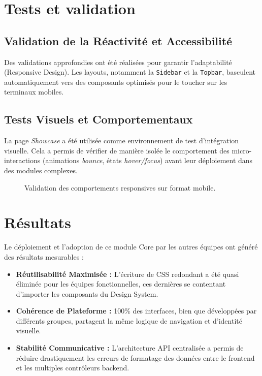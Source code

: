\documentclass[12pt,a4paper]{report}
\begin{document}
\section{Tests et validation}

\subsection{Validation de la Réactivité et Accessibilité}
Des validations approfondies ont été réalisées pour garantir l'adaptabilité (Responsive Design). Les layouts, notamment la \texttt{Sidebar} et la \texttt{Topbar}, basculent automatiquement vers des composants optimisés pour le toucher sur les terminaux mobiles.

\subsection{Tests Visuels et Comportementaux}
La page \textit{Showcase} a été utilisée comme environnement de test d'intégration visuelle. Cela a permis de vérifier de manière isolée le comportement des micro-interactions (animations \textit{bounce}, états \textit{hover/focus}) avant leur déploiement dans des modules complexes.

\begin{figure}[H]
    \centering
    \caption{Validation des comportements responsives sur format mobile.}
\end{figure}

\section{Résultats}
Le déploiement et l'adoption de ce module Core par les autres équipes ont généré des résultats mesurables :
\begin{itemize}
    \item \textbf{Réutilisabilité Maximisée :} L'écriture de CSS redondant a été quasi éliminée pour les équipes fonctionnelles, ces dernières se contentant d'importer les composants du Design System.
    \item \textbf{Cohérence de Plateforme :} 100\% des interfaces, bien que développées par différents groupes, partagent la même logique de navigation et d'identité visuelle.
    \item \textbf{Stabilité Communicative :} L'architecture API centralisée a permis de réduire drastiquement les erreurs de formatage des données entre le frontend et les multiples contrôleurs backend.
\end{itemize}
\end{document}
